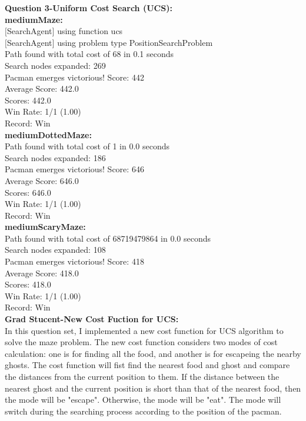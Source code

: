 \documentclass[11pt]{article}
\begin{document}
\newpage
\noindent
\textbf{Question 3-Uniform Cost Search (UCS):}\\
\textbf{mediumMaze:}\\
$[$SearchAgent$]$ using function ucs\\
$[$SearchAgent$]$ using problem type PositionSearchProblem\\
Path found with total cost of 68 in 0.1 seconds\\
Search nodes expanded: 269\\
Pacman emerges victorious! Score: 442\\
Average Score: 442.0\\
Scores:        442.0\\
Win Rate:      1/1 (1.00)\\
Record:        Win\\

\noindent
\textbf{mediumDottedMaze:}\\
Path found with total cost of 1 in 0.0 seconds\\
Search nodes expanded: 186\\
Pacman emerges victorious! Score: 646\\
Average Score: 646.0\\
Scores:        646.0\\
Win Rate:      1/1 (1.00)\\
Record:        Win\\

\noindent
\textbf{mediumScaryMaze:}\\
Path found with total cost of 68719479864 in 0.0 seconds\\
Search nodes expanded: 108\\
Pacman emerges victorious! Score: 418\\
Average Score: 418.0\\
Scores:        418.0\\
Win Rate:      1/1 (1.00)\\
Record:        Win\\

\newpage
\noindent
\textbf{Grad Stucent-New Cost Fuction for UCS:}\\
In this question set, I implemented a new cost function for UCS algorithm to solve the maze problem. The new cost function considers two modes of cost calculation: one is for finding all the food, and another is for escapeing the nearby ghosts. The cost function will fist find the nearest food and ghost and compare the distances from the current position to them. If the distance between the nearest ghost and the current position is short than that of the nearest food, then the mode will be "escape". Otherwise, the mode will be "eat". The mode will switch during the searching process according to the position of the pacman.\\
\end{document}
